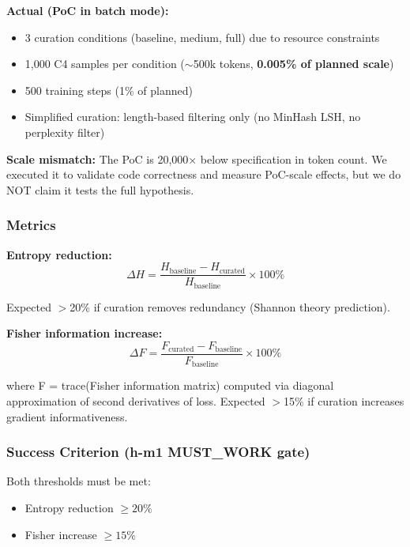 \textbf{Actual (PoC in batch mode):}
\begin{itemize}
\item 3 curation conditions (baseline, medium, full) due to resource constraints
\item 1,000 C4 samples per condition ($\sim$500k tokens, \textbf{0.005\% of planned scale})
\item 500 training steps (1\% of planned)
\item Simplified curation: length-based filtering only (no MinHash LSH, no perplexity filter)
\end{itemize}

\textbf{Scale mismatch:} The PoC is 20,000$\times$ below specification in token count. We executed it to validate code correctness and measure PoC-scale effects, but we do NOT claim it tests the full hypothesis.

\subsubsection{Metrics}

\textbf{Entropy reduction:}
\begin{equation}
\Delta H = \frac{H_{\text{baseline}} - H_{\text{curated}}}{H_{\text{baseline}}} \times 100\%
\end{equation}

Expected $>$20\% if curation removes redundancy (Shannon theory prediction).

\textbf{Fisher information increase:}
\begin{equation}
\Delta F = \frac{F_{\text{curated}} - F_{\text{baseline}}}{F_{\text{baseline}}} \times 100\%
\end{equation}

where F = trace(Fisher information matrix) computed via diagonal approximation of second derivatives of loss. Expected $>$15\% if curation increases gradient informativeness.

\subsubsection{Success Criterion (h-m1 MUST\_WORK gate)}

Both thresholds must be met:
\begin{itemize}
\item Entropy reduction $\geq 20\%$
\item Fisher increase $\geq 15\%$
\end{itemize}

